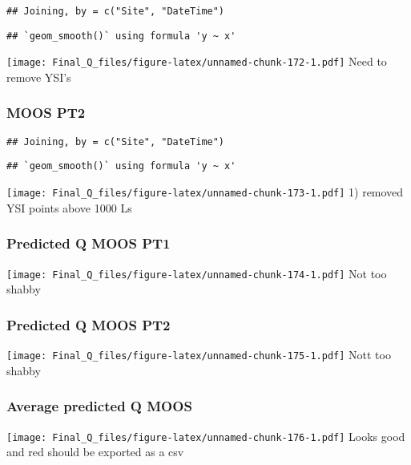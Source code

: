 \documentclass[
]{article}
\begin{document}
\begin{verbatim}
## Joining, by = c("Site", "DateTime")
\end{verbatim}

\begin{verbatim}
## `geom_smooth()` using formula 'y ~ x'
\end{verbatim}

\texttt{[image: Final\_Q\_files/figure-latex/unnamed-chunk-172-1.pdf]}
Need to remove YSI's

\hypertarget{moos-pt2}{%
\subsubsection{MOOS PT2}\label{moos-pt2}}

\begin{verbatim}
## Joining, by = c("Site", "DateTime")
\end{verbatim}

\begin{verbatim}
## `geom_smooth()` using formula 'y ~ x'
\end{verbatim}

\texttt{[image: Final\_Q\_files/figure-latex/unnamed-chunk-173-1.pdf]} 1)
removed YSI points above 1000 Ls

\hypertarget{predicted-q-moos-pt1-1}{%
\subsubsection{Predicted Q MOOS PT1}\label{predicted-q-moos-pt1-1}}

\texttt{[image: Final\_Q\_files/figure-latex/unnamed-chunk-174-1.pdf]} Not
too shabby

\hypertarget{predicted-q-moos-pt2}{%
\subsubsection{Predicted Q MOOS PT2}\label{predicted-q-moos-pt2}}

\texttt{[image: Final\_Q\_files/figure-latex/unnamed-chunk-175-1.pdf]}
Nott too shabby

\hypertarget{average-predicted-q-moos}{%
\subsubsection{Average predicted Q
MOOS}\label{average-predicted-q-moos}}

\texttt{[image: Final\_Q\_files/figure-latex/unnamed-chunk-176-1.pdf]}
Looks good and red should be exported as a csv
\end{document}
